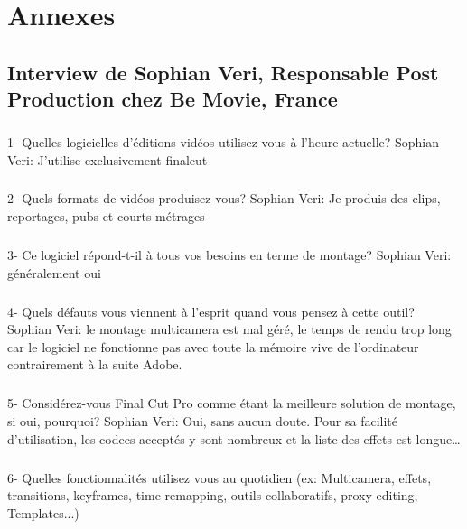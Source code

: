 \newpage

\chapter*{Annexes}
\section*{Interview de Sophian Veri,
Responsable Post Production chez Be Movie, France}

\paragraph{}
1-  Quelles logicielles d'éditions vidéos utilisez-vous à l'heure actuelle?
Sophian Veri: J'utilise exclusivement finalcut

\paragraph{}
2- Quels formats de vidéos produisez vous?
Sophian Veri: Je produis des clips, reportages, pubs et courts métrages

\paragraph{}
3- Ce logiciel répond-t-il à tous vos besoins en terme de montage?
Sophian Veri: généralement oui

\paragraph{}
4- Quels défauts vous viennent à l'esprit quand vous pensez à cette outil?
Sophian Veri: le montage multicamera est mal géré, le temps de rendu trop long car le
logiciel ne fonctionne pas avec toute la mémoire vive de l'ordinateur
contrairement à la suite Adobe.

\paragraph{}
5- Considérez-vous Final Cut Pro comme étant la meilleure solution de montage,
si oui, pourquoi?
Sophian Veri: Oui, sans aucun doute. Pour sa facilité d'utilisation,
les codecs acceptés y sont nombreux et la liste des effets est
longue\ldots

\paragraph{}
6-  Quelles fonctionnalités utilisez vous au quotidien (ex: Multicamera, effets,
transitions, keyframes, time remapping, outils collaboratifs, proxy
editing, Templates...)

